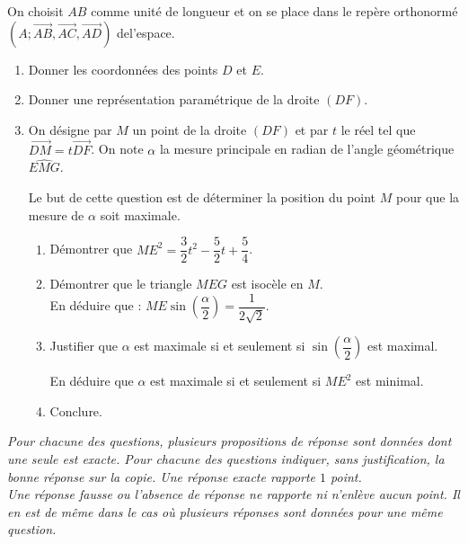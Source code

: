 \documentclass{cornouaille}
\begin{document}
\begin{colonne*exercice}
\begin{exercice}
  On choisit $AB$ comme unité de longueur et on se place dans le
  repère orthonormé
  $(A;\overrightarrow{AB},\overrightarrow{AC},\overrightarrow{AD})$
  de\linebreak l'espace.
  \begin{enumerate}
  \item Donner les coordonnées des points $D$ et $E$.
  \item Donner une représentation paramétrique de la droite $(DF)$.
  \item On désigne par $M$ un point de la droite $(DF)$ et par $t$ le
    réel tel que $\overrightarrow{DM}=t\overrightarrow{DF}$. On note
    $\alpha$ la mesure principale en radian de l'angle géométrique
    $\widehat{EMG}$.

    Le but de cette question est de déterminer la position du point
    $M$ pour que la mesure de $\alpha$ soit maximale.
    \begin{enumerate}
    \item Démontrer que
      $ME^2=\dfrac{3}{2}t^2-\dfrac{5}{2}t+\dfrac{5}{4}$.

      \vspace{2mm}

    \item Démontrer que le triangle $MEG$ est isocèle en $M$.\\
      En déduire que :
      $ME \sin(\dfrac{\alpha}{2})=\dfrac{1}{2\sqrt{2}}$.
    \item Justifier que $\alpha$ est maximale si et seulement si
      $\sin(\dfrac{\alpha}{2})$ est maximal.

      En déduire que $\alpha$ est maximale si et seulement si $ME^2$
      est minimal.
    \item Conclure.
    \end{enumerate}
  \end{enumerate}
\end{exercice}

\begin{exercice}

  \emph{Pour chacune des questions, plusieurs propositions de réponse
    sont données dont une seule est exacte. Pour chacune des questions
    indiquer, sans justification, la bonne réponse sur la copie. Une
    réponse exacte rapporte $1$ point.\\ Une réponse fausse ou l'absence
    de réponse ne rapporte ni n'enlève aucun point. Il en est de même
    dans le cas où plusieurs réponses sont données pour une même
    question.}


\end{exercice}
\end{colonne*exercice}
\end{document}
